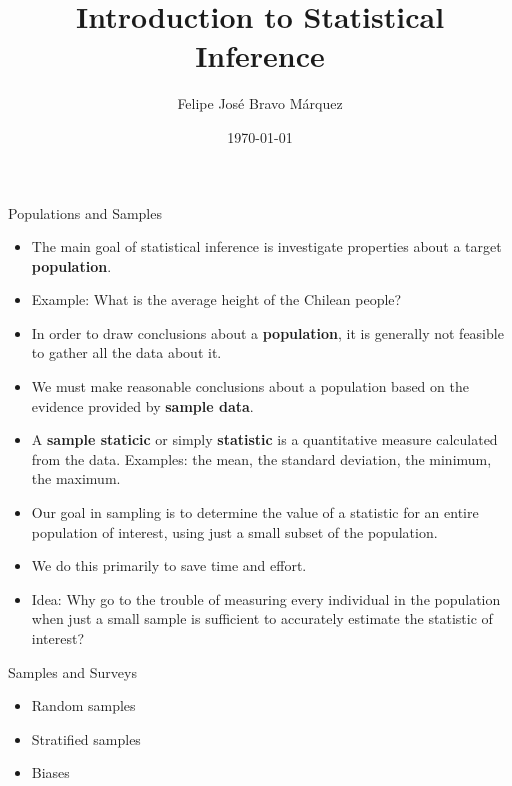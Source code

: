 \documentclass[handout]{beamer}
\title{Introduction to Statistical Inference}
\author[Felipe Bravo Márquez]{\footnotesize
 \textcolor[rgb]{0.00,0.00,1.00}{Felipe José Bravo Márquez}}
\date{ \today }
\begin{document}
\begin{frame}
\titlepage


\end{frame}




\begin{frame}{Populations and Samples}
\scriptsize{
\begin{itemize}
 \item The main goal of statistical inference is investigate properties about a target \textbf{population}.
 \item Example: What is the average height of the Chilean people? 
  \item In order to draw conclusions about a \textbf{population}, it is generally not feasible to gather all the data about it.
 \item We must make reasonable conclusions about a population based on the evidence provided by \textbf{sample data}.

 \item A \textbf{sample staticic} or simply \textbf{statistic} is a quantitative measure calculated from the data. Examples: the mean, the standard deviation, the minimum, the maximum.
 
 
 \item Our goal in sampling is to determine the value of a statistic for an entire population of interest, using just a small subset of the population.
 
 \item We do this primarily to save time and effort.
 
 \item Idea: Why go to the trouble of measuring every individual in the population when just a small sample is sufficient to accurately estimate the statistic of interest? \cite{poldrack2019statistical}
 
 

\end{itemize}

} 
\end{frame}


\begin{frame}{Samples and Surveys}
\scriptsize{
\begin{itemize}
 \item Random samples
 \item Stratified samples
 \item Biases

\end{itemize}

} 
\end{frame}
\end{document}

